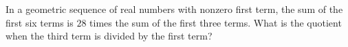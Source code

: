 In a geometric sequence of real numbers with nonzero first term, the sum of the first six terms is $28$ times the sum of the first three terms. What is the quotient when the third term is divided by the first term?
